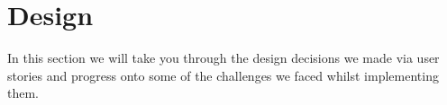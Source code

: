 \section{Design}
In this section we will take you through the design decisions we made via user stories and progress onto some of the challenges we faced whilst implementing them.

